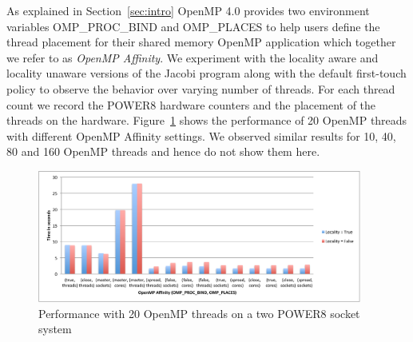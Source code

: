 As explained in Section~\ref{sec:intro} OpenMP 4.0 provides two environment variables OMP\_PROC\_BIND and OMP\_PLACES to help users define the thread placement for their shared memory OpenMP application which together we refer to as \textit{OpenMP Affinity}.%
%
 We experiment with the locality aware and locality unaware versions of the Jacobi program along with the default first-touch policy to observe the behavior over varying number of threads. 
 For each thread count we record the POWER8 hardware counters and the placement of the threads on the hardware. 
 Figure~\ref{fig:20th} shows the performance of 20 OpenMP threads with different OpenMP Affinity settings. We observed similar results for 10, 40, 80 and 160 OpenMP threads and hence do not show them here.
%
\begin{figure}[h!]
  \centering
  \includegraphics[height=0.4\textwidth, width=0.95\textwidth]{./Images/20Perf.pdf}
       \caption{Performance with 20 OpenMP threads on a two POWER8 socket system}
       \label{fig:20th}
\end{figure}
%
